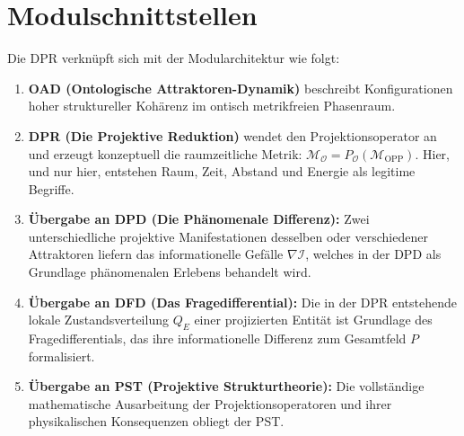 \documentclass[11pt,a4paper]{article}
\theoremstyle{plain}
\theoremstyle{definition}
\begin{document}
\section{Modulschnittstellen}

Die DPR verkn\"{u}pft sich mit der Modularchitektur wie folgt:

\begin{enumerate}
  \item \textbf{OAD (Ontologische Attraktoren-Dynamik)} beschreibt Konfigurationen
        hoher struktureller Koh\"{a}renz im ontisch metrikfreien Phasenraum.
  \item \textbf{DPR (Die Projektive Reduktion)} wendet den Projektionsoperator an und
        erzeugt konzeptuell die raumzeitliche Metrik:
        $\mathcal{M}_{\mathcal{O}} = P_{\mathcal{O}}(\mathcal{M}_{\text{OPP}})$. Hier,
        und nur hier, entstehen Raum, Zeit, Abstand und Energie als legitime Begriffe.
  \item \textbf{\"{U}bergabe an DPD (Die Ph\"{a}nomenale Differenz):} Zwei
        unterschiedliche projektive Manifestationen desselben oder verschiedener
        Attraktoren liefern das informationelle Gef\"{a}lle $\nabla \mathcal{I}$, welches
        in der DPD als Grundlage ph\"{a}nomenalen Erlebens behandelt wird.
  \item \textbf{\"{U}bergabe an DFD (Das Fragedifferential):} Die in der DPR entstehende
        lokale Zustandsverteilung $Q_E$ einer projizierten Entit\"{a}t ist Grundlage des
        Fragedifferentials, das ihre informationelle Differenz zum Gesamtfeld $P$
        formalisiert.
  \item \textbf{\"{U}bergabe an PST (Projektive Strukturtheorie):} Die vollst\"{a}ndige
        mathematische Ausarbeitung der Projektionsoperatoren und ihrer physikalischen
        Konsequenzen obliegt der PST.
\end{enumerate}
\end{document}
